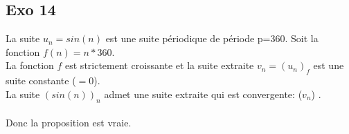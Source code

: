 \documentclass[]{book}
\theoremstyle{definition}
\begin{document}
\subsection*{Exo 14}
La suite $u_n=sin(n)$ est une suite p\'eriodique de p\'eriode p=360. Soit la fonction $f(n) = n * 360$. \\
La fonction $f$ est strictement croissante et la suite extraite $v_n=(u_n)_{f}$ est une suite constante ($=0$). \\
La suite $(sin (n))_{n}$ admet une suite extraite qui est convergente: ($v_n$) . \\
\\ 
Donc la proposition est vraie.
\end{document}
